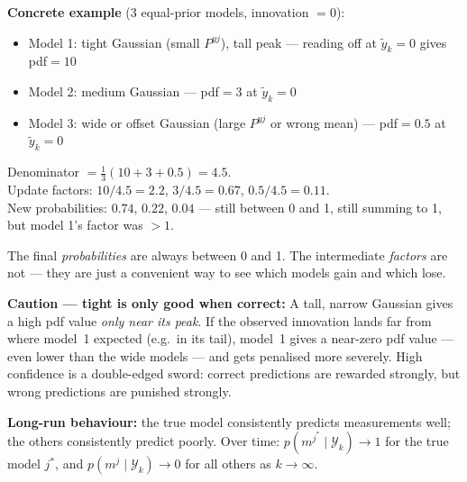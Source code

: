 \documentclass[12pt, a4paper]{article}
\begin{document}
\begin{notebox}
  \textbf{Concrete example} (3 equal-prior models, innovation $= 0$):
  \begin{itemize}[leftmargin=1.5em, itemsep=1pt]
    \item Model 1: tight Gaussian (small $P^{yj}$), tall peak
      --- reading off at $\tilde{y}_k = 0$ gives pdf$= 10$
    \item Model 2: medium Gaussian --- pdf$= 3$ at $\tilde{y}_k = 0$
    \item Model 3: wide or offset Gaussian (large $P^{yj}$ or wrong mean)
      --- pdf$= 0.5$ at $\tilde{y}_k = 0$
  \end{itemize}
  Denominator $= \tfrac{1}{3}(10 + 3 + 0.5) = 4.5$.\\
  Update factors: $10/4.5 = 2.2$,\; $3/4.5 = 0.67$,\; $0.5/4.5 = 0.11$.\\
  New probabilities: $0.74$,\; $0.22$,\; $0.04$ --- still between 0 and
  1, still summing to 1, but model 1's factor was $> 1$.

  The final \emph{probabilities} are always between 0 and 1.
  The intermediate \emph{factors} are not --- they are just a convenient
  way to see which models gain and which lose.

  \textbf{Caution --- tight is only good when correct:}
  A tall, narrow Gaussian gives a high pdf value \emph{only near its
  peak}.
  If the observed innovation lands far from where model~1 expected
  (e.g.\ in its tail), model~1 gives a near-zero pdf value --- even lower
  than the wide models --- and gets penalised more severely.
  High confidence is a double-edged sword: correct predictions are
  rewarded strongly, but wrong predictions are punished strongly.

  \textbf{Long-run behaviour:}
  the true model consistently predicts measurements well; the others
  consistently predict poorly.
  Over time: $p(m^{j^*} \mid \mathcal{Y}_k) \to 1$ for the true model
  $j^*$, and $p(m^j \mid \mathcal{Y}_k) \to 0$ for all others as
  $k \to \infty$.
\end{notebox}
\end{document}
